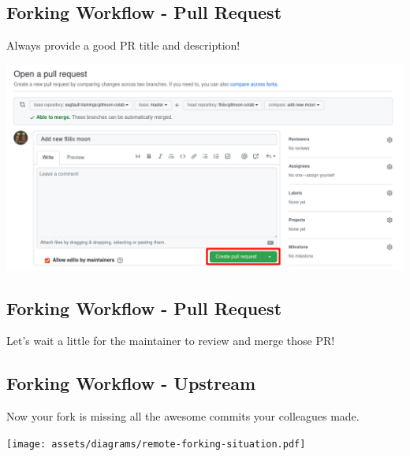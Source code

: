 \subsection{Forking Workflow - Pull Request}
\begin{frame}[fragile]
  \subslidetitle

  Always provide a good PR title and description!

  \vspace{1em}
  \centerline{\includegraphics[width=\textwidth]{../assets/images/github-pull-request-submit.png}}

\end{frame}

\subsection{Forking Workflow - Pull Request}
\begin{frame}[fragile]
  \subslidetitle

  \vspace{8em}
  \begin{center}
  Let's wait a little for the maintainer to review and merge those PR!
  \end{center}

\end{frame}

\subsection{Forking Workflow - Upstream}
\begin{frame}[fragile]
  \subslidetitle

  Now your fork is missing all the awesome commits your colleagues made.

  \vspace{2em}
  \centerline{\texttt{[image: assets/diagrams/remote-forking-situation.pdf]}}

\end{frame}

